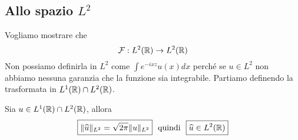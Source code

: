 \subsection{Allo spazio $L^{2}$}

Vogliamo mostrare che
\begin{equation*}
\mathcal{F} : L^{2}(\mathbb{R})\rightarrow L^{2}(\mathbb{R})
\end{equation*}
Non possiamo definirla in $L^{2}$ come $\int e^{- ixz} u(x) dx$ perché se $u\in L^{2}$ non abbiamo nessuna garanzia che la funzione sia integrabile. Partiamo definendo la trasformata in $L^{1}(\mathbb{R}) \cap L^{2}(\mathbb{R})$.
\begin{thm}
[di Plancherel]
Sia $u\in L^{1}(\mathbb{R}) \cap L^{2}(\mathbb{R})$, allora
\begin{equation*}
\boxed{ \Vert \hat{u} \Vert_{L^{2}} = \sqrt{2\pi} \Vert u \Vert_{L^{2}}} \ \ \text{quindi} \ \ \boxed{\hat{u} \in L^{2}(\RR)}
\end{equation*}
\end{thm}
